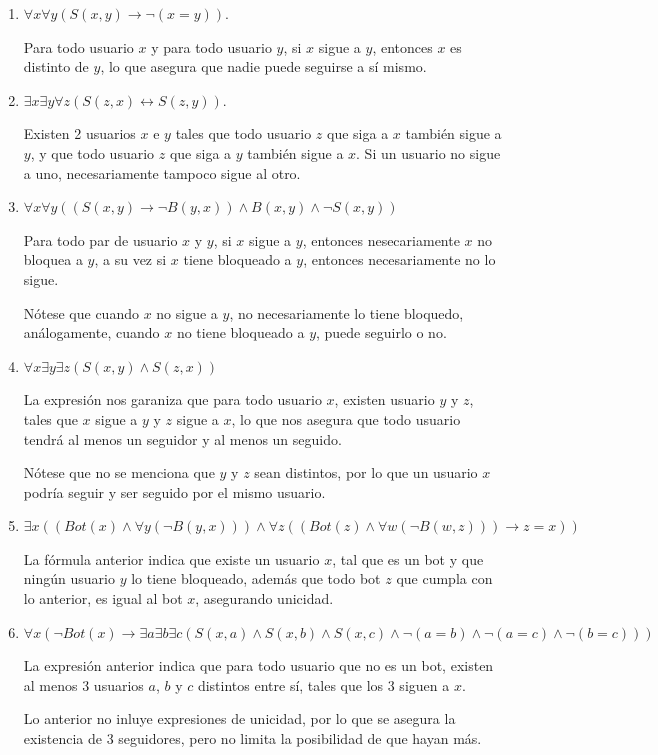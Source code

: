 \documentclass[12pt]{article}
\newcommand{\lra}{\leftrightarrow}
\begin{document}
\begin{enumerate}[label=(\alph*)]
    \item $\forall x \forall y (S(x, y) \rightarrow \neg (x = y))$.

    Para todo usuario $x$ y para todo usuario $y$, si $x$ sigue a $y$, entonces $x$ es distinto de $y$, lo que asegura 
    que nadie puede seguirse a sí mismo.

    \item $\exists x \exists y \forall z (S(z, x) \lra S(z, y))$.
    
    Existen 2 usuarios $x$ e $y$ tales que todo usuario $z$ que siga a $x$ también sigue a $y$, y que todo usuario $z$ que siga a $y$
    también sigue a $x$. Si un usuario no sigue a uno, necesariamente tampoco sigue al otro.

    \item $\forall x \forall y ((S(x, y) \rightarrow \neg B(y, x)) \land B(x, y) \land \neg S(x, y))$
    
    Para todo par de usuario $x$ y $y$, si $x$ sigue a $y$, entonces nesecariamente $x$ no bloquea a $y$, a su vez si $x$ tiene 
    bloqueado a $y$, entonces necesariamente no lo sigue. 
    
    Nótese que cuando $x$ no sigue a $y$, no necesariamente lo tiene bloquedo, análogamente, cuando $x$ no tiene bloqueado 
    a $y$, puede seguirlo o no.

    \item $\forall x \exists y \exists z (S(x, y) \land S(z, x))$
    
    La expresión nos garaniza que para todo usuario $x$, existen usuario $y$ y $z$, tales que $x$ sigue a $y$ y $z$ sigue a $x$,
    lo que nos asegura que todo usuario tendrá al menos un seguidor y al menos un seguido.

    Nótese que no se menciona que $y$ y $z$ sean distintos, por lo que un usuario $x$ podría seguir y ser seguido por el mismo usuario.

    \item $\exists x ((Bot(x) \land \forall y (\neg B(y, x))) \land \forall z ((Bot(z) \land \forall w (\neg B(w, z))) \rightarrow z = x))$
    
    La fórmula anterior indica que existe un usuario $x$, tal que es un bot y que ningún usuario $y$ lo tiene bloqueado, además que todo bot $z$ 
    que cumpla con lo anterior, es igual al bot $x$, asegurando unicidad.

    \item $\forall x (\neg Bot(x) \rightarrow \exists a \exists b \exists c
    (S(x, a) \land S(x, b) \land S(x, c) \land \neg (a = b) \land \neg (a = c) \land \neg (b = c)))$

    La expresión anterior indica que para todo usuario que no es un bot, existen al menos 3 usuarios $a$, $b$ y $c$ distintos entre sí,
    tales que los 3 siguen a $x$.

    Lo anterior no inluye expresiones de unicidad, por lo que se asegura la existencia de 3 seguidores, pero no limita la posibilidad de que hayan más.
\end{enumerate}


\end{document}
